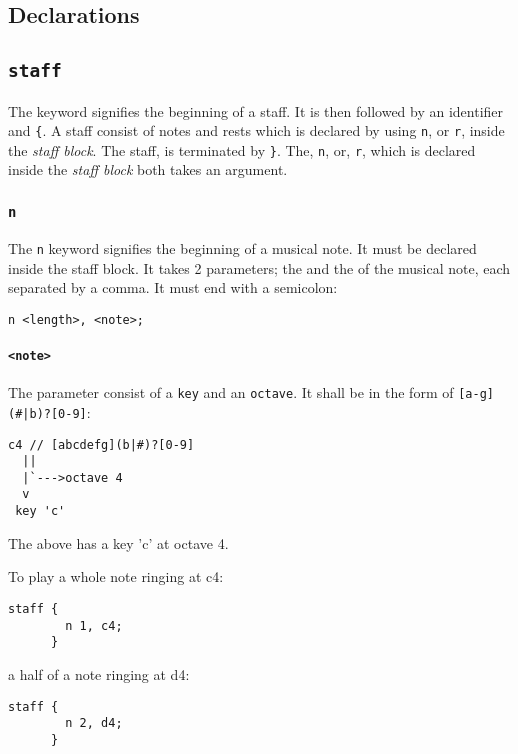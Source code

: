 \subsection{Declarations}

\subsection{\texttt{staff}}
\np The  keyword signifies the beginning of a staff. It is then followed by an identifier and \verb+{+. A staff consist of
notes and rests which is declared by using \verb+n+, or \verb+r+, inside the \textit{staff block}.
The staff, is terminated by \verb+}+. The, \verb+n+, or, \verb+r+, which is declared inside the \textit{staff block} both takes an argument.

\subsubsection{\texttt{n}}

\np The \verb+n+ keyword signifies the beginning of a musical note. It must be declared
inside the staff block.
It takes 2 parameters; the  and the  of the
musical note, each separated by a comma. It must end with a semicolon: 

\begin{Verbatim}[frame=single]
      n <length>, <note>;
\end{Verbatim}

\paragraph{\texttt{<note>}} The parameter  consist of a \verb+key+ and an \verb+octave+. It shall be in the form of \verb+[a-g](#|b)?[0-9]+:

\begin{Verbatim}[frame=single]
  c4 // [abcdefg](b|#)?[0-9]
  ||
  |`--->octave 4
  v
 key 'c'
\end{Verbatim}
The above has a key 'c' at octave 4.

\np To play a whole note ringing at c4:
\begin{Verbatim}[frame=single]
      staff {
        n 1, c4;
      }
\end{Verbatim}

a half of a note ringing at d4:

\begin{Verbatim}[frame=single]
      staff {
        n 2, d4;
      }
\end{Verbatim}

